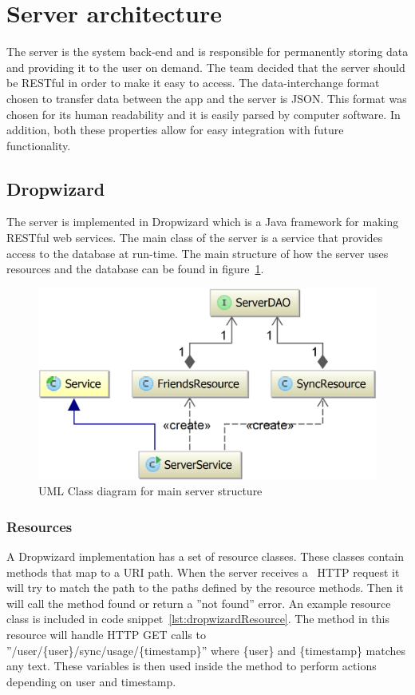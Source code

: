 \section{Server architecture}
\label{sec:arch_server}
The server is the system back-end and is responsible for permanently storing data and providing it to the user on demand. The team decided that the server should be RESTful in order to make it easy to access. The data-interchange format chosen to transfer data between the app and the server is JSON. This format was chosen for its human readability and it is easily parsed by computer software. In addition, both these properties allow for easy integration with future functionality.

\subsection{Dropwizard}
The server is implemented in Dropwizard which is a Java framework for making RESTful web services. The main class of the server is a service that provides access to the database at run-time. The main structure of how the server uses resources and the database can be found in figure~\ref{fig:classDiagramServer}.

\begin{figure}[H]
\includegraphics[width=\textwidth]{ch/architecture/fig/classDiagramServer.png}
\caption{UML Class diagram for main server structure}
\label{fig:classDiagramServer}
\end{figure}

\subsubsection{Resources}
A Dropwizard implementation has a set of resource classes. These classes contain methods that map to a URI path. When the server receives a ~\gls{HTTP} request it will try to match the path to the paths defined by the resource methods. Then it will call the method found or return a ''not found'' error. An example resource class is included in code snippet~\ref{lst:dropwizardResource}. The method in this resource will handle HTTP GET calls to ''/user/\{user\}/sync/usage/\{timestamp\}'' where \{user\} and \{timestamp\} matches any text. These variables is then used inside the method to perform actions depending on user and timestamp.
\newline


